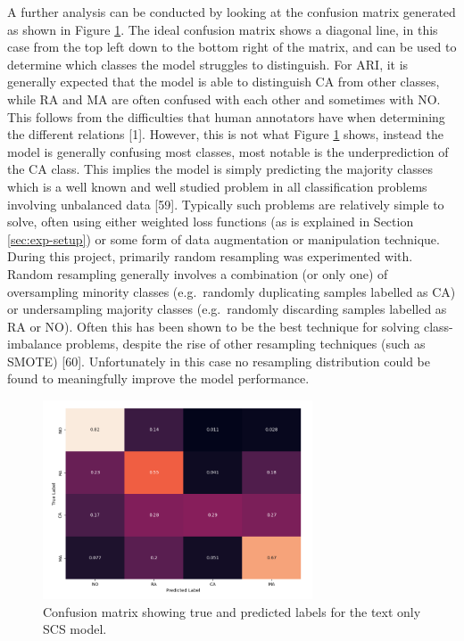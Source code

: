 \documentclass[twocolumn]{article}
\begin{document}
A further analysis can be conducted by looking at the confusion matrix
generated as shown in Figure \ref{fig:text-only-conf-mat-4class}. The
ideal confusion matrix shows a diagonal line, in this case from the top
left down to the bottom right of the matrix, and can be used to
determine which classes the model struggles to distinguish. For ARI, it
is generally expected that the model is able to distinguish CA from
other classes, while RA and MA are often confused with each other and
sometimes with NO. This follows from the difficulties that human
annotators have when determining the different relations {[}1{]}.
However, this is not what Figure \ref{fig:text-only-conf-mat-4class}
shows, instead the model is generally confusing most classes, most
notable is the underprediction of the CA class. This implies the model
is simply predicting the majority classes which is a well known and well
studied problem in all classification problems involving unbalanced data
{[}59{]}. Typically such problems are relatively simple to solve, often
using either weighted loss functions (as is explained in Section
\ref{sec:exp-setup}) or some form of data augmentation or manipulation
technique. During this project, primarily random resampling was
experimented with. Random resampling generally involves a combination
(or only one) of oversampling minority classes (e.g.~randomly
duplicating samples labelled as CA) or undersampling majority classes
(e.g.~randomly discarding samples labelled as RA or NO). Often this has
been shown to be the best technique for solving class-imbalance
problems, despite the rise of other resampling techniques (such as
SMOTE) {[}60{]}. Unfortunately in this case no resampling distribution
could be found to meaningfully improve the model performance.

\begin{figure}[h]
\centering
\includegraphics[width=8cm]{text-only-conf-mat-4class}
\caption{Confusion matrix showing true and predicted labels for the text only SCS model.\label{fig:text-only-conf-mat-4class}}
\end{figure}
\end{document}
